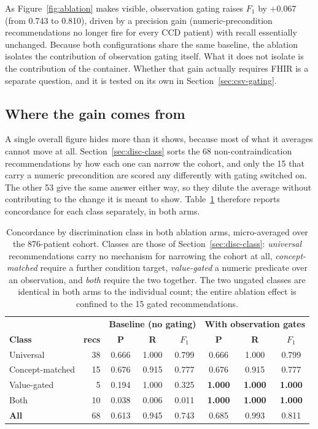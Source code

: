 As Figure~\ref{fig:ablation} makes visible, observation gating raises $F_1$ by
$+0.067$ (from 0.743 to 0.810), driven by a
precision gain (numeric-precondition recommendations no longer fire for every CCD patient)
with recall essentially unchanged. Because both configurations
share the same baseline, the ablation isolates the contribution of observation gating
itself. What it does not isolate is the contribution of the container. Whether that gain
actually requires FHIR is a separate question, and it is tested on its own in
Section~\ref{sec:csv-gating}.

\subsection{Where the gain comes from}
\label{sec:ablation-class}
A single overall figure hides more than it shows, because most of what it averages
cannot move at all. Section~\ref{sec:disc-class} sorts the 68 non-contraindication
recommendations by how each one can narrow the cohort, and only the 15 that carry a numeric
precondition are scored any differently with gating switched on. The other 53 give the same
answer either way, so they dilute the average without contributing to the change it is meant
to show. Table~\ref{tab:ablation-class} therefore reports concordance for each class
separately, in both arms.

\begin{table}[h]
\centering
\caption{Concordance by discrimination class in both ablation arms, micro-averaged over
the 876-patient cohort. Classes are those of Section~\ref{sec:disc-class}:
\emph{universal} recommendations carry no mechanism for narrowing the cohort at all,
\emph{concept-matched} require a further condition target, \emph{value-gated} a numeric
predicate over an observation, and \emph{both} require the two together. The two ungated
classes are identical in both arms to the individual count; the entire ablation effect is
confined to the 15 gated recommendations.}
\label{tab:ablation-class}
\footnotesize
\setlength{\tabcolsep}{4pt}
\begin{tabular}{lr|ccc|ccc}
\hline
& & \multicolumn{3}{c|}{\textbf{Baseline (no gating)}}
  & \multicolumn{3}{c}{\textbf{With observation gates}} \\
\textbf{Class} & \textbf{recs} & \textbf{P} & \textbf{R} & \textbf{$F_1$}
                               & \textbf{P} & \textbf{R} & \textbf{$F_1$} \\
\hline
Universal        & 38 & 0.666 & 1.000 & 0.799 & 0.666 & 1.000 & 0.799 \\
Concept-matched  & 15 & 0.676 & 0.915 & 0.777 & 0.676 & 0.915 & 0.777 \\
Value-gated      & \phantom{0}5 & 0.194 & 1.000 & 0.325
                                & \textbf{1.000} & \textbf{1.000} & \textbf{1.000} \\
Both             & 10 & 0.038 & 0.006 & 0.011
                                & \textbf{1.000} & \textbf{1.000} & \textbf{1.000} \\
\hline
\textbf{All}     & 68 & 0.613 & 0.945 & 0.743 & 0.685 & 0.993 & 0.811 \\
\hline
\end{tabular}
\end{table}

